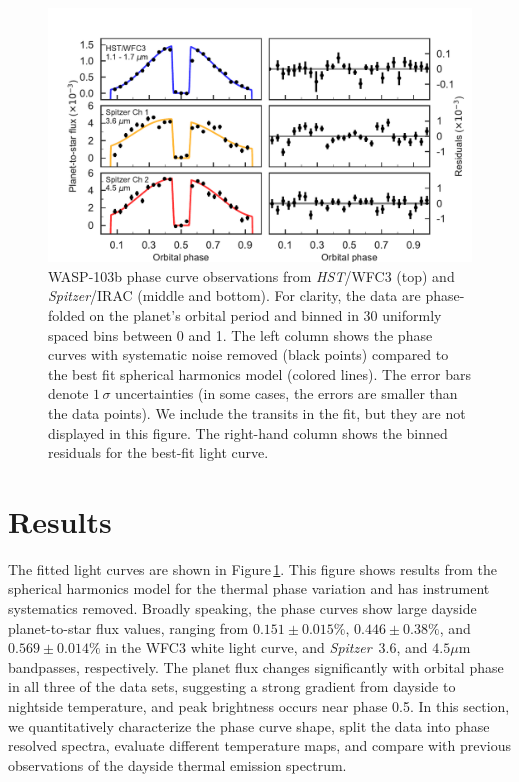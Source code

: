 \documentclass[twocolumn]{aastex61}
\newcommand{\project}[1]{\textsl{#1}}
\newcommand{\HST}{\project{HST}}
\newcommand{\Spitzer}{\project{Spitzer}}
\begin{document}
\begin{figure}
\includegraphics[width = 1.0\textwidth]{Figures/phase_curves_spherical.pdf}
\caption{WASP-103b phase curve observations from \HST/WFC3 (top) and \Spitzer/IRAC (middle and bottom). For clarity, the data are phase-folded on the planet's orbital period and binned in 30 uniformly spaced bins between 0 and 1. The left column shows the phase curves with systematic noise removed (black points) compared to the best fit spherical harmonics model (colored lines). The error bars denote $1\,\sigma$ uncertainties (in some cases, the errors are smaller than the data points).  We include the transits in the fit, but they are not displayed in this figure. The right-hand column shows the binned residuals for the best-fit light curve.}
\label{fig:phasecurves}
\end{figure}

\section{Results}
\label{sec:results}
The fitted light curves are shown in Figure\,\ref{fig:phasecurves}. This figure shows results from the spherical harmonics model for the thermal phase variation and has instrument systematics removed.  Broadly speaking, the phase curves show large dayside planet-to-star flux values, ranging from $0.151\pm0.015\%$, $0.446\pm0.38\%$, and $0.569\pm0.014\%$ in the WFC3 white light curve, and \Spitzer\ $3.6$, and $4.5\mu$m bandpasses, respectively.  The planet flux changes significantly with orbital phase in all three of the data sets, suggesting a strong gradient from dayside to nightside temperature, and peak brightness occurs near phase 0.5. In this section, we quantitatively characterize the phase curve shape, split the data into phase resolved spectra, evaluate different temperature maps, and compare with previous observations of the dayside thermal emission spectrum.
\end{document}
